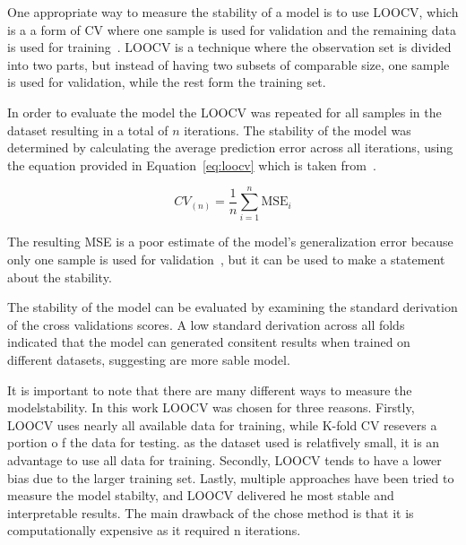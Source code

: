 One appropriate way to measure the stability of a model is to use \ac{LOOCV},
which is a a form of \ac{CV} where one sample is used for validation and the remaining
data is used for training~\cite[p. 200--201]{gareth2013introduction}.
LOOCV is a technique where the observation set is divided into two parts, but instead of having
two subsets of comparable size, one sample is used for validation, while the rest form the
training set.

In order to evaluate the model the \ac{LOOCV} was repeated for all samples in
the dataset resulting in a total of \(n\) iterations.
The stability of the model was determined by calculating the average prediction error across all
iterations, using the equation provided in Equation~\ref{eq:loocv} which is taken from~\cite[p.
201]{gareth2013introduction}.

\begin{tcolorbox}[arc=0pt,boxrule=0.5pt]
    \begin{equation}
        CV_{(n)} = \frac{1}{n} \sum_{i=1}^{n} \text{MSE}_{i}\label{eq:loocv}
    \end{equation}
\end{tcolorbox}

The resulting \ac{MSE} is a poor estimate of the model's generalization error because only one
sample is used for validation~\cite[p. 201]{gareth2013introduction}, but it can be used to make a
statement about the stability.

The stability of the model can be evaluated by examining the standard derivation of the cross
validations scores.
A low standard derivation across all folds indicated that the model can generated consitent
results when trained on different datasets, suggesting are more sable model.

It is important to note that there are many different ways to measure the modelstability.
In this work LOOCV was chosen for three reasons.
Firstly, \ac{LOOCV} uses nearly all available data for training, while K-fold CV resevers a
portion o f the data for testing.
as the dataset used is relatfively small, it is an advantage to use all data for training.
Secondly, \ac{LOOCV} tends to have a lower bias due to the larger training set.
Lastly, multiple approaches have been tried to measure the model stabilty, and LOOCV delivered
he most stable and interpretable results.
The main drawback of the chose method is that it is computationally expensive as it required n
iterations.

